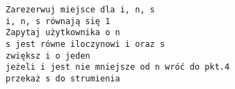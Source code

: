 \begin{verbatim}
Zarezerwuj miejsce dla i, n, s
i, n, s równają się 1 
Zapytaj użytkownika o n
s jest równe iloczynowi i oraz s
zwiększ i o jeden
jeżeli i jest nie mniejsze od n wróć do pkt.4
przekaż s do strumienia  
\end{verbatim}